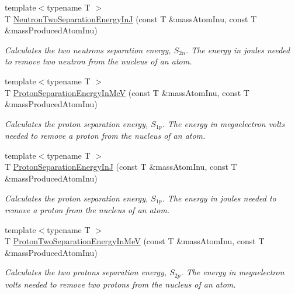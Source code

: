 \begin{DoxyCompactItemize}
{\footnotesize template$<$typename T $>$ }\\T \mbox{\hyperlink{group___e_g_x_phys-_nuclear_separation_energy_ga293ac9428420a0adf4235048dbe529b4}{Neutron\+Two\+Separation\+Energy\+InJ}} (const T \&mass\+Atom\+Inu, const T \&mass\+Produced\+Atom\+Inu)
\begin{DoxyCompactList}\small\item\em Calculates the two neutrons separation energy, $S_{2n}$. The energy in joules needed to remove two neutron from the nucleus of an atom. \end{DoxyCompactList}\item 
{\footnotesize template$<$typename T $>$ }\\T \mbox{\hyperlink{group___e_g_x_phys-_nuclear_separation_energy_ga6a619ded55c47ed22ea2d8a85202ebeb}{Proton\+Separation\+Energy\+In\+MeV}} (const T \&mass\+Atom\+Inu, const T \&mass\+Produced\+Atom\+Inu)
\begin{DoxyCompactList}\small\item\em Calculates the proton separation energy, $S_{1p}$. The energy in megaelectron volts needed to remove a proton from the nucleus of an atom. \end{DoxyCompactList}\item 
{\footnotesize template$<$typename T $>$ }\\T \mbox{\hyperlink{group___e_g_x_phys-_nuclear_separation_energy_ga4274d8f5a3860169fd81970707eb582a}{Proton\+Separation\+Energy\+InJ}} (const T \&mass\+Atom\+Inu, const T \&mass\+Produced\+Atom\+Inu)
\begin{DoxyCompactList}\small\item\em Calculates the proton separation energy, $S_{1p}$. The energy in joules needed to remove a proton from the nucleus of an atom. \end{DoxyCompactList}\item 
{\footnotesize template$<$typename T $>$ }\\T \mbox{\hyperlink{group___e_g_x_phys-_nuclear_separation_energy_ga0de42783a7c650eb32f85dc2d40d84d7}{Proton\+Two\+Separation\+Energy\+In\+MeV}} (const T \&mass\+Atom\+Inu, const T \&mass\+Produced\+Atom\+Inu)
\begin{DoxyCompactList}\small\item\em Calculates the two protons separation energy, $S_{2p}$. The energy in megaelectron volts needed to remove two protons from the nucleus of an atom. \end{DoxyCompactList}\item 

\end{DoxyCompactItemize}
